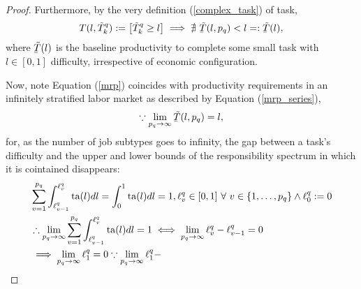 \documentclass[hidelinks, nonatbib]{elsarticle}
\begin{document}
\begin{lemma}
\begin{proof}
        Furthermore, by the very definition (\ref{complex_task}) of task,
        \begin{gather}
            \label{mrp}
            T(l, \tilde{T}_{k}^{q})
            := 
            \left[
                \tilde{T}_{k}^{q}
                \geq
                l
            \right]
            \implies
            \nexists \
            \underaccent{\bar}{\tilde{T}}(l, p_q)
            <
            l
            =:
            \underaccent{\bar}{\tilde{T}}(l)
            ,
        \end{gather}
        where $\underaccent{\bar}{\tilde{T}}(l)$ is the baseline productivity to complete some small task with $l \in [0,1]$ difficulty, irrespective of economic configuration.
        
        Now, note Equation (\ref{mrp}) coincides with productivity requirements in an infinitely stratified labor market as described by Equation (\ref{mrp_series}),
        \begin{gather}
            \because
            \lim_{p_q \rightarrow \infty}{
                \underaccent{\bar}{\tilde{T}}(l, p_q)
            }
            =
            l
            ,
        \end{gather}
        for, as the number of job subtypes goes to infinity, the gap between a task's difficulty and the upper and lower bounds of the responsibility spectrum in which it is cointained disappears:
        \begin{align}
            &
            \sum_{v=1}^{p_q}
            \int_{\ell_{v-1}^{q}}^{\ell_{v}^{q}}
            \ta(l)dl
            =
            \int_{0}^{1}
            \ta(l)dl
            =
            1,
            \ell_{v}^{q} \in [0,1]
            \
            \forall
            \
            v \in \{1, \dots, p_q\}
            \land
            \ell_{0}^{q}
            := 0
            \\
            &
            \therefore
            \lim_{p_q \rightarrow \infty}{
                \sum_{v=1}^{p_q}
                \int_{\ell_{v-1}^{q}}^{\ell_{v}^{q}}
                \ta(l)dl
            } 
            =
            1
            \iff
            \lim_{p_q \rightarrow \infty}{
                \ell_{v}^{q} - \ell_{v-1}^{q}
            }
            =
            0
            \\
            &
            \implies
            \lim_{p_q \rightarrow \infty}
            \ell_{1}^{q}
            = 0
            \because
            \lim_{p_q \rightarrow \infty}
            \ell_{1}^{q} - 

\end{align}
\end{proof}
\end{lemma}
\end{document}
